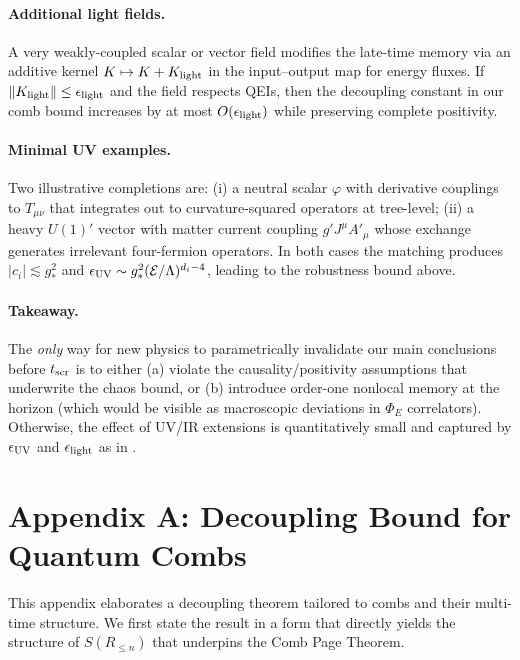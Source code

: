 \documentclass[a4paper,11pt]{article}
\newcommand{\Eflux}{\Phi_E}
\theoremstyle{plain}
\theoremstyle{definition}
\theoremstyle{remark}
\begin{document}
\paragraph{Additional light fields.} A very weakly-coupled scalar or vector field modifies the late-time memory via an additive kernel $K\mapsto K+K_{\rm light}$ in the input--output map for energy fluxes. If $\|K_{\rm light}\|\le \epsilon_{\rm light}$ and the field respects QEIs, then the decoupling constant in our comb bound increases by at most $O(\epsilon_{\rm light})$ while preserving complete positivity.

\paragraph{Minimal UV examples.} Two illustrative completions are: (i) a neutral scalar $\varphi$ with derivative couplings to $T_{\mu\nu}$ that integrates out to curvature-squared operators at tree-level; (ii) a heavy $U(1)'$ vector with matter current coupling $g' J^\mu A'_\mu$ whose exchange generates irrelevant four-fermion operators. In both cases the matching produces $|c_i|\lesssim g_\ast^2$ and $\epsilon_{\rm UV}\sim g_\ast^2(\mathcal{E}/\Lambda)^{d_i-4}$, leading to the robustness bound above.

\paragraph{Takeaway.} The \emph{only} way for new physics to parametrically invalidate our main conclusions before $t_{\rm scr}$ is to either (a) violate the causality/positivity assumptions that underwrite the chaos bound, or (b) introduce order-one nonlocal memory at the horizon (which would be visible as macroscopic deviations in $\Eflux$ correlators). Otherwise, the effect of UV/IR extensions is quantitatively small and captured by $\epsilon_{\rm UV}$ and $\epsilon_{\rm light}$ as in .


\appendix

\section{Appendix A: Decoupling Bound for Quantum Combs}
\label{app:decoupling}
This appendix elaborates a decoupling theorem tailored to combs and their multi-time structure. We first state the result in a form that directly yields the structure of $S(R_{\le n})$ that underpins the Comb Page Theorem.
\end{document}
